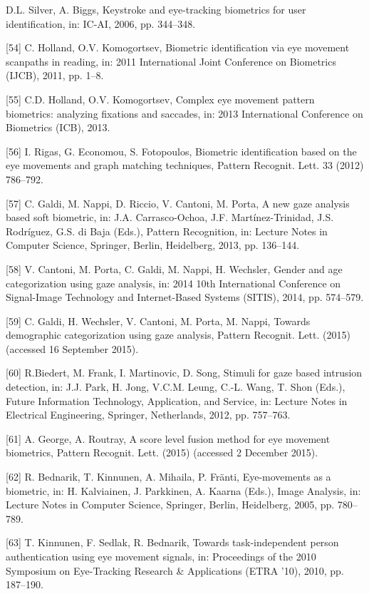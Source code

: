 \documentclass{article}
\begin{document}
\begin{raggedright}
[53] D.L. Silver, A. Biggs, Keystroke and eye-tracking biometrics for user identification, in: IC-AI, 2006, pp. 344–348.

[54] C. Holland, O.V. Komogortsev, Biometric identification via eye movement scanpaths in reading, in: 2011 International Joint Conference on Biometrics (IJCB), 2011, pp. 1–8.

[55] C.D. Holland, O.V. Komogortsev, Complex eye movement pattern biometrics: analyzing fixations and saccades, in: 2013 International Conference on Biometrics (ICB), 2013.

[56] I. Rigas, G. Economou, S. Fotopoulos, Biometric identification based on the eye movements and graph matching techniques, Pattern Recognit. Lett. 33 (2012) 786–792.

[57] C. Galdi, M. Nappi, D. Riccio, V. Cantoni, M. Porta, A new gaze analysis based soft biometric, in: J.A. Carrasco-Ochoa, J.F. Martínez-Trinidad, J.S. Rodríguez, G.S. di Baja (Eds.), Pattern Recognition, in: Lecture Notes in Computer Science, Springer, Berlin, Heidelberg, 2013, pp. 136–144.

[58] V. Cantoni, M. Porta, C. Galdi, M. Nappi, H. Wechsler, Gender and age categorization using gaze analysis, in: 2014 10th International Conference on Signal-Image Technology and Internet-Based Systems (SITIS), 2014, pp. 574–579.

[59] C. Galdi, H. Wechsler, V. Cantoni, M. Porta, M. Nappi, Towards demographic categorization using gaze analysis, Pattern Recognit. Lett. (2015) (accessed 16 September 2015).

[60] R.Biedert, M. Frank, I. Martinovic, D. Song, Stimuli for gaze based intrusion detection, in: J.J. Park, H. Jong, V.C.M. Leung, C.-L. Wang, T. Shon (Eds.), Future Information Technology, Application, and Service, in: Lecture Notes in Electrical Engineering, Springer, Netherlands, 2012, pp. 757–763.

[61] A. George, A. Routray, A score level fusion method for eye movement biometrics, Pattern Recognit. Lett. (2015) (accessed 2 December 2015).

[62] R. Bednarik, T. Kinnunen, A. Mihaila, P. Fränti, Eye-movements as a biometric, in: H. Kalviainen, J. Parkkinen, A. Kaarna (Eds.), Image Analysis, in: Lecture Notes in Computer Science, Springer, Berlin, Heidelberg, 2005, pp. 780–789.

[63] T. Kinnunen, F. Sedlak, R. Bednarik, Towards task-independent person authentication using eye movement signals, in: Proceedings of the 2010 Symposium on Eye-Tracking Research \& Applications (ETRA '10), 2010, pp. 187–190. 


\end{raggedright}
\end{document}
